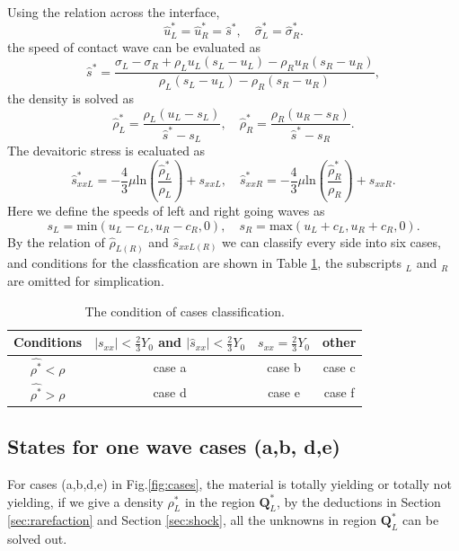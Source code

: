 \documentclass[review]{elsarticle}
\begin{document}
Using the relation across the interface,
\begin{equation}
  \hat{u}_L^* = \hat{u}_R^* =\hat{s}^*,\quad \hat{\sigma}_L^* = \hat{\sigma}_R^*.
\end{equation}
the speed of contact wave can be evaluated as 
\begin{equation}
\hat{s}^* = \frac{\sigma_L-\sigma_R+\rho_L u_L(s_L-u_L)-\rho_R u_R(s_R-u_R)}{\rho_L(s_L-u_L)-\rho_R(s_R-u_R)},
\end{equation}
the density is solved as 
\begin{equation}
\hat{\rho}_L^* = \frac{\rho_L(u_L-s_L)}{\hat{s}^*-s_L}, \quad
\hat{\rho}_R^* = \frac{\rho_R(u_R-s_R)}{\hat{s}^*-s_R}.
\end{equation}
The devaitoric stress is ecaluated as 
\begin{equation}  \label{sxx1}
  \hat{s}_{xxL}^*=-\frac{4}{3}\mu\text{ln}(\frac{\hat{\rho}_L^*}{\rho_L})+s_{xxL}, \quad   \hat{s}_{xxR}^*=-\frac{4}{3}\mu\text{ln}(\frac{\hat{\rho}_R^*}{\rho_R})+s_{xxR}.
\end{equation}
Here we define the speeds of left and right going waves as
 \begin{equation}
      s_L = \text{min} (u_L-c_L, u_R-c_R, 0),  \quad s_R = \text{max}(u_L+c_L, u_R+c_R, 0).
\end{equation}
By  the relation of $\hat{\rho}_{L(R)}$ and  $\hat{s}_{xxL(R)}$ we can classify every side into six cases, and conditions for the classfication are  shown in Table \ref{tab:cases}, the  subscripts $_L$ and  $_R$  are omitted for simplication. 

\begin{table}
  \centering 
  \caption{The condition of  cases classification.}
  \begin{tabular}{c|ccc}
	\toprule
	Conditions & $|s_{xx}|<\frac{2}{3}Y_0$ and $|\hat{s}_{xx}|<\frac{2}{3}Y_0$ & $s_{xx}=\frac{2}{3}Y_0$&  other\\
  \midrule
  $\hat{\rho^*} <\rho$ & case a& case b& case c \\
  $\hat{\rho^*} >\rho$ & case d& case e& case f \\
  \bottomrule
\end{tabular}
\label{tab:cases}
\end{table}

\subsection{States for one wave cases (a,b, d,e)}
For cases (a,b,d,e) in Fig.\ref{fig:cases}, the material is totally yielding or totally not yielding, if we give a density $\rho_L^*$ in the region $\mathbf{Q}_L^*$, by the deductions in Section \ref{sec:rarefaction} and Section \ref{sec:shock}, all the unknowns in region $\mathbf{Q}_L^*$ can be solved out.
\end{document}
